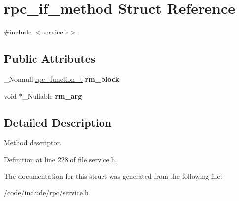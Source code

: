 \hypertarget{structrpc__if__method}{}\section{rpc\+\_\+if\+\_\+method Struct Reference}
\label{structrpc__if__method}


{\ttfamily \#include $<$service.\+h$>$}

\subsection*{Public Attributes}
\begin{DoxyCompactItemize}
\item 
\mbox{\label{structrpc__if__method_a5db192112740ed1adb36f74ff7c92a80}} 
\+\_\+\+Nonnull \hyperlink{service_8h_ae49a22468cfcd4adfa558078e9e4e312}{rpc\+\_\+function\+\_\+t} {\bfseries rm\+\_\+block}
\item 
\mbox{\label{structrpc__if__method_a85a2f339a726ef4afb885cbf157c0998}} 
void $\ast$\+\_\+\+Nullable {\bfseries rm\+\_\+arg}
\end{DoxyCompactItemize}


\subsection{Detailed Description}
Method descriptor. 

Definition at line 228 of file service.\+h.



The documentation for this struct was generated from the following file\+:\begin{DoxyCompactItemize}
\item 
/code/include/rpc/\hyperlink{service_8h}{service.\+h}\end{DoxyCompactItemize}
